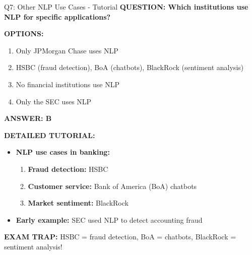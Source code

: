 \documentclass[8pt]{beamer}
\begin{document}
	\begin{frame}{Q7: Other NLP Use Cases - Tutorial}
		\fontsize{6.5}{7.5}\selectfont
		\textbf{QUESTION: Which institutions use NLP for specific applications?}
		
		\vspace{0.1cm}
		\textbf{OPTIONS:}
		\begin{enumerate}
			\item Only JPMorgan Chase uses NLP
			\item HSBC (fraud detection), BoA (chatbots), BlackRock (sentiment analysis)
			\item No financial institutions use NLP
			\item Only the SEC uses NLP
		\end{enumerate}
		
		\vspace{0.1cm}
		\textcolor{myblue}{\textbf{ANSWER: B}}
		
		\vspace{0.1cm}
		\textbf{DETAILED TUTORIAL:}
		\begin{itemize}
			\item \textbf{NLP use cases in banking:}
			\begin{enumerate}
				\item \textbf{Fraud detection:} HSBC
				\item \textbf{Customer service:} Bank of America (BoA) chatbots
				\item \textbf{Market sentiment:} BlackRock
			\end{enumerate}
			\item \textbf{Early example:} SEC used NLP to detect accounting fraud
		\end{itemize}
		
		\textcolor{myred}{\textbf{EXAM TRAP:}} HSBC = \textcolor{myblue}{fraud detection}, BoA = \textcolor{myblue}{chatbots}, BlackRock = \textcolor{myblue}{sentiment analysis}!
	\end{frame}
	
\end{document}
